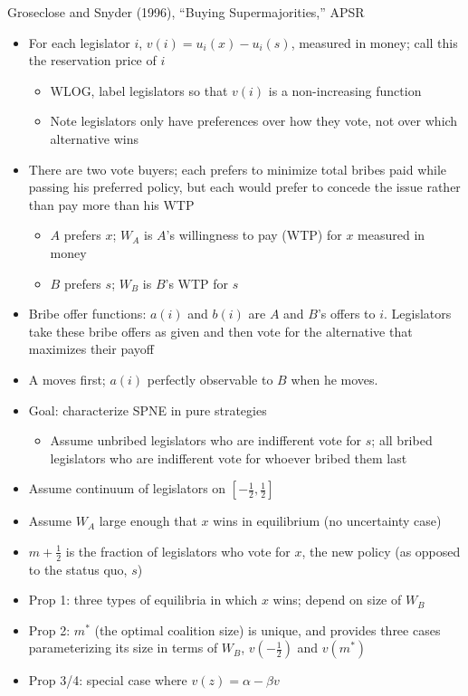 \documentclass[12pt]{article}
\begin{document}
\newpage
Groseclose and Snyder (1996), ``Buying Supermajorities,'' APSR
\begin{itemize}
	\item For each legislator $i$, $v(i) = u_i(x) - u_i(s)$, measured in money; call this the reservation price of $i$
		\begin{itemize}
			\item WLOG, label legislators so that $v(i)$ is a non-increasing function 
			\item Note legislators only have preferences over how they vote, not over which alternative wins
		\end{itemize}
	\item There are two vote buyers; each prefers to minimize total bribes paid while passing his preferred policy, but each would prefer to concede the issue rather than pay more than his WTP
		\begin{itemize}
			\item $A$ prefers $x$; $W_A$ is $A$'s willingness to pay (WTP) for $x$ measured in money
			\item $B$ prefers $s$; $W_B$ is $B$'s WTP for $s$
		\end{itemize}
	\item Bribe offer functions: $a(i)$ and $b(i)$ are $A$ and $B$'s offers to $i$. Legislators take these bribe offers as given and then vote for the alternative that maximizes their payoff
	\item A moves first; $a(i)$ perfectly observable to $B$ when he moves.
	\item Goal: characterize SPNE in pure strategies
		\begin{itemize}
			\item Assume unbribed legislators who are indifferent vote for $s$; all bribed legislators who are indifferent vote for whoever bribed them last
		\end{itemize}
	\item Assume continuum of legislators on $\left[-\frac{1}{2},\frac{1}{2}\right]$
	\item Assume $W_A$ large enough that $x$ wins in equilibrium (no uncertainty case)
	\item $m + \frac{1}{2}$ is the fraction of legislators who vote for $x$, the new policy (as opposed to the status quo, $s$)
	\item Prop 1: three types of equilibria in which $x$ wins; depend on size of $W_B$
	\item Prop 2: $m^*$ (the optimal coalition size) is unique, and provides three cases parameterizing its size in terms of $W_B$, $v(-\frac{1}{2})$ and $v(m^*)$
	\item Prop 3/4: special case where $v(z) = \alpha - \beta v$
\end{itemize}
\end{document}
